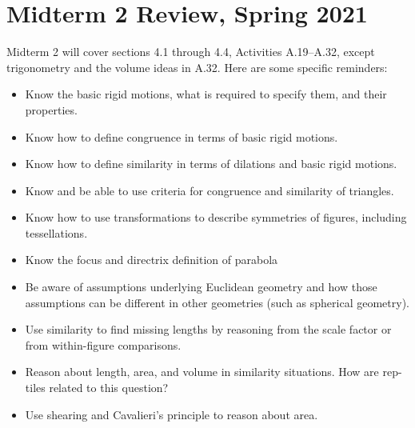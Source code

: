 \newpage

\section{Midterm 2 Review, Spring 2021}


Midterm 2 will cover sections 4.1 through 4.4, Activities A.19--A.32, except trigonometry and the volume ideas in A.32. Here are some specific reminders:
\begin{itemize}\itemsep-3pt
\item Know the basic rigid motions, what is required to specify them, and their properties. 
\item Know how to define congruence in terms of basic rigid motions. 
\item Know how to define similarity in terms of dilations and basic rigid motions.  
\item Know and be able to use criteria for congruence and similarity of triangles.  
\item Know how to use transformations  to describe symmetries of figures, including tessellations.  
\item Know the focus and directrix definition of parabola %
\item Be aware of assumptions underlying Euclidean geometry and how those assumptions can be different in other geometries (such as spherical geometry).  
\item Use similarity to find missing lengths by reasoning from the scale factor or from within-figure comparisons.   
\item Reason about length, area, and volume in similarity situations.  How are rep-tiles related to this question?  
\item Use shearing and Cavalieri's principle to reason about area. %
\end{itemize}



